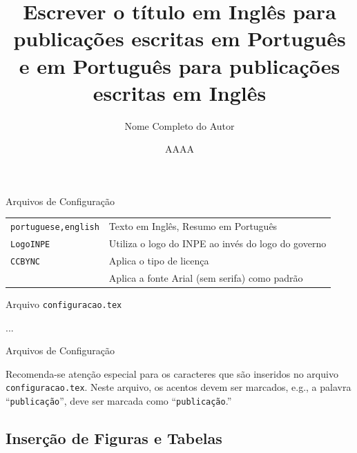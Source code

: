 \documentclass[10pt]{beamer}
\begin{document}
\begin{frame}{Arquivos de Configuração}
\begin{table}[H]
{\begin{tabular}{p{5cm}p{5cm}}
    {\tt portuguese,english}                    & Texto em Inglês, Resumo em Português \\
    {\tt LogoINPE}                              & Utiliza o logo do INPE ao invés do logo do governo \\
    {\tt CCBYNC}                                & Aplica o tipo de licença \\
    \texttt{\renewcommand{\rmdefault}{phv}}& Aplica a fonte Arial (sem serifa) como padrão \\
    \bottomrule
    \end{tabular}
    }
\end{table}
\end{frame}

\begingroup
{}
\begin{frame}{}
  \begin{meucomandolf}{Arquivo {\tt configuracao.tex}}
    \title{Escrever o t\'{i}tulo em Ingl\^{e}s para publicaç\~{o}es escritas em Portugu\^{e}s e em Portugu\^{e}s para publicaç\~{o}es escritas em Ingl\^{e}s} 
    \author{Nome Completo do Autor}
    \date{AAAA}
    ... 
  \end{meucomandolf}
\end{frame}
\endgroup

\begin{frame}{Arquivos de Configuração}
  \begin{marker}
  Recomenda-se atenção especial para os caracteres que são inseridos no arquivo {\tt configuracao.tex}. Neste arquivo, os acentos devem ser marcados, e.g., a palavra ``{\tt publicação}'', deve ser marcada como ``\texttt{publicaç\~{a}o}.''
  \end{marker}
\end{frame}

\subsection{Inserção de Figuras e Tabelas}
\end{document}
